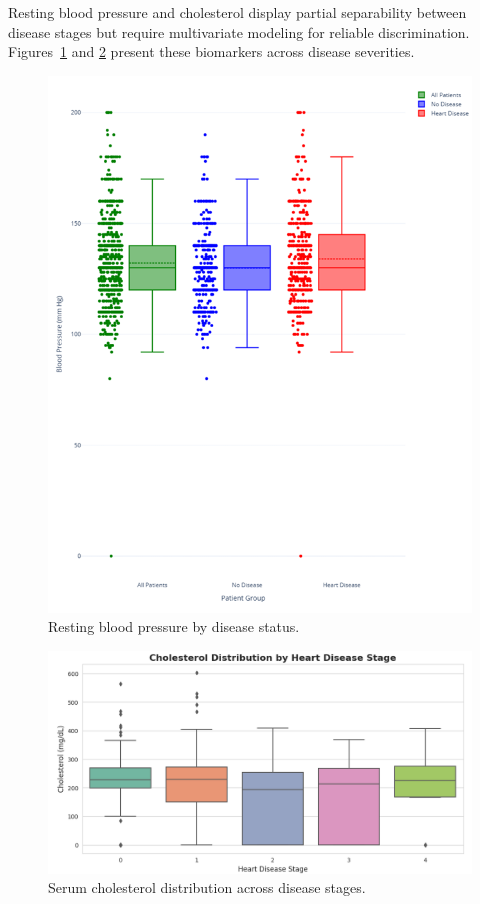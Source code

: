 \documentclass[conference]{IEEEtran}
\begin{document}
Resting blood pressure and cholesterol display partial separability between disease stages but require multivariate modeling for reliable discrimination. Figures~\ref{fig:bp} and \ref{fig:chol} present these biomarkers across disease severities.

\begin{figure}[t]
  \centering
  \includegraphics[width=0.85\linewidth]{resting_blood_pressure_by_disease_status.png}
  \caption{Resting blood pressure by disease status.}
  \label{fig:bp}
\end{figure}

\begin{figure}[t]
  \centering
  \includegraphics[width=0.85\linewidth]{serum_cholesterol_across_disease_stages.png}
  \caption{Serum cholesterol distribution across disease stages.}
  \label{fig:chol}
\end{figure}
\end{document}
